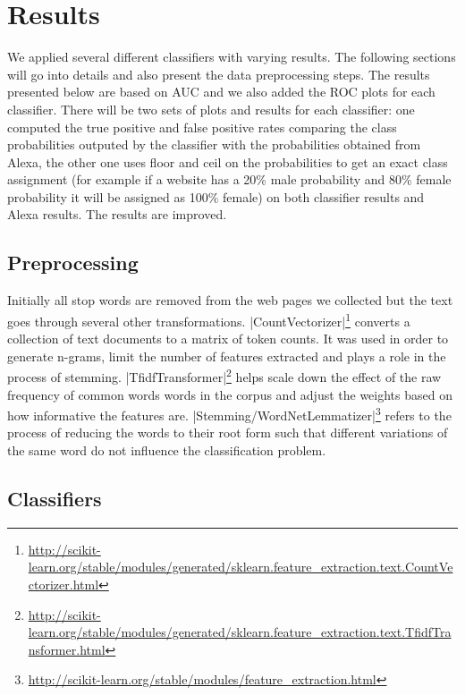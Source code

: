 \section{Results}

We applied several different classifiers with varying results. The following sections will go into details and also present the data preprocessing steps. The results presented below are based on AUC and we also added the ROC plots for each classifier.
\newline
There will be two sets of plots and results for each classifier: one computed the true positive and false positive rates comparing the class probabilities outputed by the classifier with the probabilities obtained from Alexa, the other one uses floor and ceil on the probabilities to get an exact class assignment (for example if a website has a 20\% male probability and 80\% female probability it will be assigned as 100\% female) on both classifier results and Alexa results. The results are improved.

\subsection{Preprocessing}

Initially all stop words are removed from the web pages we collected but the text goes through several other transformations.
\newline
|CountVectorizer|\footnote{\url{http://scikit-learn.org/stable/modules/generated/sklearn.feature_extraction.text.CountVectorizer.html}} converts a collection of text documents to a matrix of token counts. It was used in order to generate n-grams, limit the number of features extracted and plays a role in the process of stemming.
\newline
|TfidfTransformer|\footnote{\url{http://scikit-learn.org/stable/modules/generated/sklearn.feature_extraction.text.TfidfTransformer.html}} helps scale down the effect of the raw frequency of common words words in the corpus and adjust the weights based on how informative the features are.
\newline
|Stemming/WordNetLemmatizer|\footnote{\url{http://scikit-learn.org/stable/modules/feature_extraction.html}} refers to the process of reducing the words to their root form such that different variations of the same word do not influence the classification problem.

\subsection{Classifiers}

